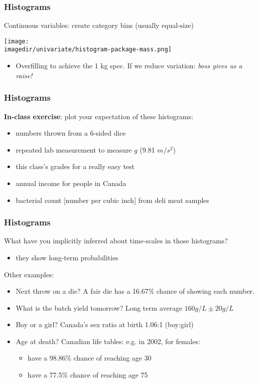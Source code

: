 \begin{frame}\frametitle{Histograms}
	Continuous variables: create category bins (usually equal-size)
	\begin{center}
		\texttt{[image: \\imagedir/univariate/histogram-package-mass.png]}
	\end{center}
	\begin{itemize}
		\item	Overfilling to achieve the 1 kg spec. If we reduce variation: \emph{boss gives us a raise!}
	\end{itemize}
\end{frame}

\begin{frame}\frametitle{Histograms}
	\textbf{In-class exercise}: plot your expectation of these histograms: \vspace{2cm}
	\begin{itemize}
		\item	numbers thrown from a 6-sided dice
		\item	repeated lab measurement to measure $g$ (9.81 $m/s^2$)
		\item	this class's grades for a really easy test
		\item	annual income for people in Canada
		\item	bacterial count [number per cubic inch] from deli meat samples
	\end{itemize}
\end{frame}

\begin{frame}\frametitle{Histograms}
	What have you implicitly inferred about time-scales in those histograms?
	\begin{itemize}
		\item	they show long-term probabilities
	\end{itemize}

	Other examples:
	\begin{itemize}
		\item	Next throw on a die? A fair die has a 16.67\% chance of showing each number.
		\item	What is the batch yield tomorrow? Long term average $160 g/L \pm 20 g/L$
		\item	Boy or a girl? Canada's sex ratio at birth 1.06:1 (boy:girl)
		\item	Age at death? Canadian life tables: e.g. in 2002, for females:
		\begin{itemize}
			\item	have a 98.86\% chance of reaching age 30
			\item	have a 77.5\% chance of reaching age 75
		\end{itemize}
	\end{itemize}
\end{frame}

